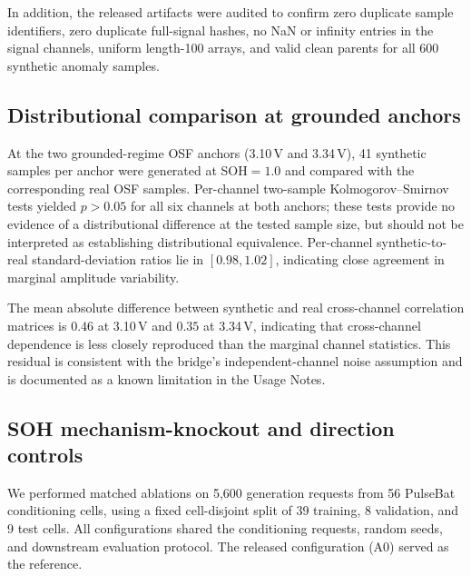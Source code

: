 \documentclass[11pt]{article}
\begin{document}
In addition, the released artifacts were audited to confirm zero duplicate
sample identifiers, zero duplicate full-signal hashes, no NaN or infinity
entries in the signal channels, uniform length-100 arrays, and valid clean
parents for all 600 synthetic anomaly samples.

\subsection*{Distributional comparison at grounded anchors}

At the two grounded-regime OSF anchors (3.10\,V and 3.34\,V), 41 synthetic
samples per anchor were generated at SOH${=}1.0$ and compared with the
corresponding real OSF samples. Per-channel two-sample
Kolmogorov--Smirnov tests yielded $p>0.05$ for all six channels at both
anchors; these tests provide no evidence of a distributional difference
at the tested sample size, but should not be interpreted as establishing
distributional equivalence. Per-channel synthetic-to-real
standard-deviation ratios lie in $[0.98,1.02]$, indicating close agreement
in marginal amplitude variability.

The mean absolute difference between synthetic and real cross-channel
correlation matrices is $0.46$ at 3.10\,V and $0.35$ at 3.34\,V,
indicating that cross-channel dependence is less closely reproduced than
the marginal channel statistics. This residual is consistent with the
bridge's independent-channel noise assumption and is documented as a
known limitation in the Usage Notes.


\subsection*{SOH mechanism-knockout and direction controls}

We performed matched ablations on 5,600 generation
requests from 56 PulseBat conditioning cells, using a
fixed cell-disjoint split of 39 training, 8 validation,
and 9 test cells. All configurations shared the
conditioning requests, random seeds, and downstream
evaluation protocol. The released configuration (A0)
served as the reference.
\end{document}

